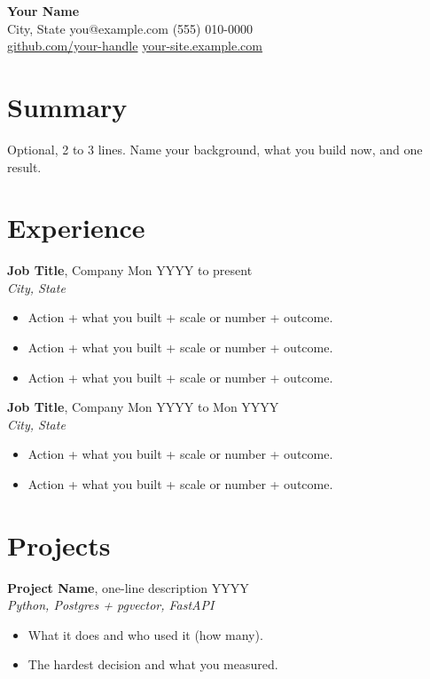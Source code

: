 \documentclass[11pt]{article}
\newcommand{\role}[4]{%
    \textbf{#1}, #2 \hfill #4\\
    \textit{#3}\par
}
\newcommand{\project}[4]{%
    \textbf{#1}, #2 \hfill #4\\
    \textit{#3}\par
}
\begin{document}
\begin{center}
    {\LARGE\bfseries Your Name}\\[3pt]
    City, State \textbar{} you@example.com \textbar{} (555) 010-0000\\
    \href{https://github.com/your-handle}{github.com/your-handle} \textbar{}
    \href{https://your-site.example.com}{your-site.example.com}
\end{center}

\section{Summary}
Optional, 2 to 3 lines. Name your background, what you build now, and one result.

\section{Experience}

\role{Job Title}{Company}{City, State}{Mon YYYY to present}
\begin{itemize}
    \item Action + what you built + scale or number + outcome.
    \item Action + what you built + scale or number + outcome.
    \item Action + what you built + scale or number + outcome.
\end{itemize}

\role{Job Title}{Company}{City, State}{Mon YYYY to Mon YYYY}
\begin{itemize}
    \item Action + what you built + scale or number + outcome.
    \item Action + what you built + scale or number + outcome.
\end{itemize}

\section{Projects}

\project{Project Name}{one-line description}{Python, Postgres + pgvector, FastAPI}{YYYY}
\begin{itemize}
    \item What it does and who used it (how many).
    \item The hardest decision and what you measured.
\end{itemize}
\end{document}
